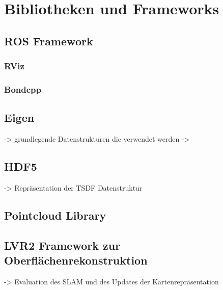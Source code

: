 \chapter{Bibliotheken und Frameworks}

\section{ROS Framework}

\subsection{RViz}

\subsection{Bondcpp}

\section{Eigen}

-> grundlegende Datenstrukturen die verwendet werden
->

\section{HDF5}

-> Repräsentation der TSDF Datenstruktur

\section{Pointcloud Library}

\section{LVR2 Framework zur Oberflächenrekonstruktion}

-> Evaluation des SLAM und des Updates der Kartenrepräsentation

